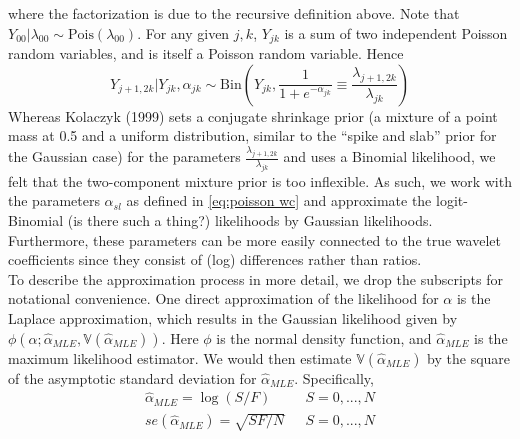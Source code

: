 \documentclass[12pt]{article}
\newcommand{\Ga}{\alpha}
\newcommand{\Gl}{\lambda}    \newcommand{\GL}{\Lambda}
\begin{document}
where the factorization is due to the recursive definition above. Note that $Y_{00}|\Gl_{00}\sim \textrm{Pois}(\Gl_{00})$. For any given $j,k$, $Y_{jk}$ is a sum of two independent Poisson random variables, and is itself a Poisson random variable. Hence
\[Y_{j+1,2k}|Y_{jk},\Ga_{jk}\sim \textrm{Bin}({Y_{jk},\frac{1}{1+e^{-\Ga_{jk}}}\equiv\frac{\Gl_{j+1,2k}}{\Gl_{jk}}})\]
Whereas Kolaczyk (1999) sets a conjugate shrinkage prior (a mixture of a point mass at 0.5 and a uniform distribution, similar to the ``spike and slab'' prior for the Gaussian case) for the parameters $\frac{\Gl_{j+1,2k}}{\Gl_{jk}}$ and uses a Binomial likelihood, we felt that the two-component mixture prior is too inflexible. As such, we work with the parameters $\Ga_{sl}$ as defined in \eqref{eq:poisson wc} and approximate the logit-Binomial (is there such a thing?) likelihoods by Gaussian likelihoods. Furthermore, these parameters can be more easily connected to the true wavelet coefficients since they consist of (log) differences rather than ratios.\bigskip\\
To describe the approximation process in more detail, we drop the subscripts for notational convenience. One direct approximation of the likelihood for $\Ga$ is the Laplace approximation, which results in the Gaussian likelihood given by $\phi(\Ga;\hat{\Ga}_{MLE},\mathbb{V}(\hat{\Ga}_{MLE}))$. Here $\phi$ is the normal density function, and $\hat{\Ga}_{MLE}$ is the maximum likelihood estimator. We would then estimate $\mathbb{V}(\hat{\Ga}_{MLE})$ by the square of the asymptotic standard deviation for $\hat{\Ga}_{MLE}$. Specifically,
\begin{eqnarray}
\hat{\Ga}_{MLE}=\log(S/F)&\ \ \ S=0,...,N\\
se(\hat{\Ga}_{MLE})=\sqrt{SF/N}&\ \ \ S=0,...,N
\end{eqnarray}
\end{document}
